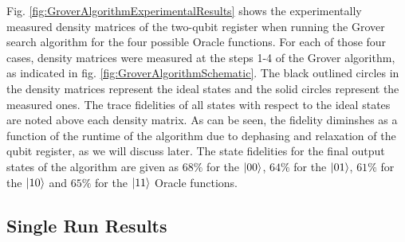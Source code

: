 Fig. \ref{fig:GroverAlgorithmExperimentalResults} shows the experimentally measured density matrices of the two-qubit register when running the Grover search algorithm for the four possible Oracle functions. For each of those four cases, density matrices were measured at the steps 1-4 of the Grover algorithm, as indicated in fig. \ref{fig:GroverAlgorithmSchematic}. The black outlined circles in the density matrices represent the ideal states and the solid circles represent the measured ones. The trace fidelities of all states with respect to the ideal states are noted above each density matrix. As can be seen, the fidelity diminshes as a function of the runtime of the algorithm due to dephasing and relaxation of the qubit register, as we will discuss later. The state fidelities for the final output states of the algorithm are given as $68\%$ for the $\left| 00 \right>$, $64\%$ for the $\left| 01 \right>$, $61\%$ for the $\left| 10 \right>$ and $65\%$ for the $\left| 11 \right>$ Oracle functions.

\subsection{Single Run Results}

